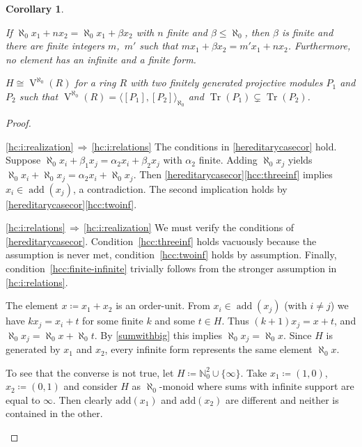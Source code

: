 \documentclass[a4paper,11pt,oneside]{amsart}
\newtheorem{cor}[teor]{Corollary}
\theoremstyle{remark}
\DeclareMathOperator{\add}{add}
\DeclareMathOperator{\Tr}{Tr}
\DeclareMathOperator{\Vmon}{V}
\begin{document}
\begin{cor}
\begin{enumerate}
\begin{equivenumerate}
\item \label{hc:sub:relations} If $\aleph _0 x_1 + n x_2 = \aleph_0 x_1 + \beta x_2$ with $n$ finite and $\beta \le \aleph_0$, then $\beta$ is finite and there are finite integers $m$,~$m'$ such that $m x_1 + \beta x_2 = m' x_1 + n x_2$.
  Furthermore, no element has an infinite and a finite form.
\item \label{hc:sub:trace} $H \cong \Vmon^{\aleph_0}(R)$ for a ring $R$ with two finitely generated projective modules $P_1$ and $P_2$ such that $\Vmon^{\aleph_0}(R) = \big\langle [P_1], [P_2] \big\rangle_{\aleph_0}$ and $\Tr(P_1) \subsetneq \Tr (P_2)$.
\end{equivenumerate}
\end{enumerate}
\end{cor}

\begin{proof}
  \begin{proofenumerate}
  \item[\ref{hc:incomparable}]
  \ref{hc:i:realization}$\,\Rightarrow\,$\ref{hc:i:relations}
  The conditions in \cref{hereditarycasecor} hold.
  Suppose $\aleph _0 x_i + \beta _1 x_j = \alpha_2 x_i + \beta_2 x_j$ with $\alpha_2$ finite.
  Adding $\aleph_0 x_j$ yields $\aleph_0 x_i + \aleph_0 x_j = \alpha_2 x_i + \aleph_0 x_j$.
  Then \cref{hereditarycasecor}\ref{hcc:threeinf} implies $x_i \in \add(x_j)$, a contradiction.
  The second implication holds by \cref{hereditarycasecor}\ref{hcc:twoinf}.

  \ref{hc:i:relations}$\,\Rightarrow\,$\ref{hc:i:realization}
  We must verify the conditions of \cref{hereditarycasecor}.
  Condition~\ref{hcc:threeinf} holds vacuously because the assumption is never met,
  condition~\ref{hcc:twoinf} holds by assumption.
  Finally, condition~\ref{hcc:finite-infinite} trivially follows from the stronger assumption in \ref{hc:i:relations}.

  \item[\ref{hc:equality}]
  The element $x \coloneqq x_1+x_2$ is an order-unit.
  From $x_i \in \add(x_j)$ (with $i \ne j$) we have $k x_j = x_i + t$ for some finite $k$ and some $t \in H$.
  Thus $(k+1)x_j = x + t$, and $\aleph_0 x_j = \aleph_0 x + \aleph_0 t$.
  By \cref{sumwithbig} this implies $\aleph_0 x_j = \aleph_0 x$.
  Since $H$ is generated by $x_1$ and $x_2$, every infinite form represents the same element $\aleph_0 x$.

  To see that the converse is not true, let $H \coloneqq \mathbb N_0^2 \cup \{\infty\}$.
  Take $x_1\coloneqq (1, 0)$, $x_2\coloneqq (0, 1)$ and consider $H$ as $\aleph_0$-monoid where sums with infinite support are equal to $\infty$. 
Then clearly $\text{add}(x_1) $ and $\text{add}(x_2)$ are different and neither is contained in the other.


\end{proofenumerate}
\end{proof}
\end{document}
